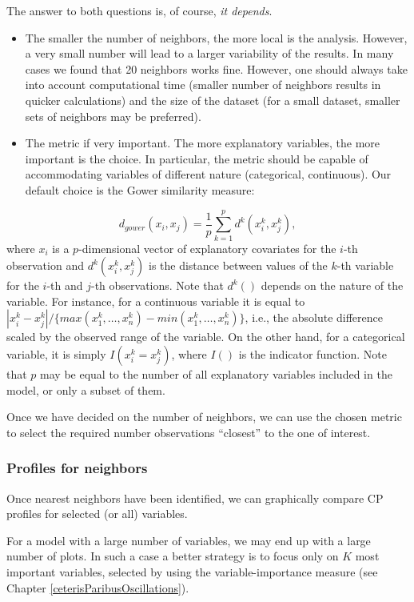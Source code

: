 \documentclass[12pt,]{krantz}
\providecommand{\tightlist}{%
  \setlength{\itemsep}{0pt}\setlength{\parskip}{0pt}}
\theoremstyle{definition}
\theoremstyle{definition}
\theoremstyle{definition}
\theoremstyle{remark}
\begin{document}
The answer to both questions is, of course, \emph{it depends}.

\begin{itemize}
\tightlist
\item
  The smaller the number of neighbors, the more local is the analysis.
  However, a very small number will lead to a larger variability of the
  results. In many cases we found that 20 neighbors works fine. However,
  one should always take into account computational time (smaller number
  of neighbors results in quicker calculations) and the size of the
  dataset (for a small dataset, smaller sets of neighbors may be
  preferred).
\item
  The metric if very important. The more explanatory variables, the more
  important is the choice. In particular, the metric should be capable
  of accommodating variables of different nature (categorical,
  continuous). Our default choice is the Gower similarity measure:
\end{itemize}

\[
d_{gower}(x_i, x_j) = \frac 1p \sum_{k=1}^p d^k(x_i^k, x_j^k),
\] where \(x_i\) is a \(p\)-dimensional vector of explanatory covariates
for the \(i\)-th observation and \(d^k(x_i^k,x_j^k)\) is the distance
between values of the \(k\)-th variable for the \(i\)-th and \(j\)-th
observations. Note that \(d^k()\) depends on the nature of the variable.
For instance, for a continuous variable it is equal to
\(|x_i^k-x_j^k|/\{max(x_1^k,\ldots,x_n^k)-min(x_1^k,\ldots,x_n^k)\}\),
i.e., the absolute difference scaled by the observed range of the
variable. On the other hand, for a categorical variable, it is simply
\(I(x_i^k = x_j^k)\), where \(I()\) is the indicator function. Note that
\(p\) may be equal to the number of all explanatory variables included
in the model, or only a subset of them.

Once we have decided on the number of neighbors, we can use the chosen
metric to select the required number observations ``closest'' to the one
of interest.

\hypertarget{cPLocDiagProfiles}{%
\subsubsection{Profiles for neighbors}\label{cPLocDiagProfiles}}

Once nearest neighbors have been identified, we can graphically compare
CP profiles for selected (or all) variables.

For a model with a large number of variables, we may end up with a large
number of plots. In such a case a better strategy is to focus only on
\(K\) most important variables, selected by using the
variable-importance measure (see Chapter
\ref{ceterisParibusOscillations}).
\end{document}
